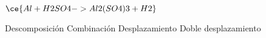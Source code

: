 $\ce{Al + H2SO4 -> Al2(SO4)3 + H2}$

\begin{choices}
    \choice Descomposición
    \choice Combinación
    \CorrectChoice Desplazamiento
    \choice Doble desplazamiento
\end{choices}